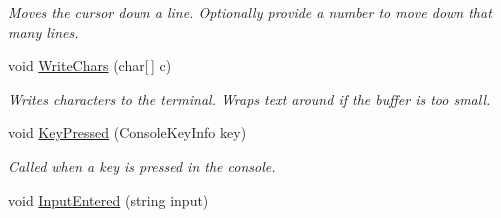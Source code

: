 \begin{DoxyCompactItemize}
\begin{DoxyCompactList}\small\item\em Moves the cursor down a line. Optionally provide a number to move down that many lines.\end{DoxyCompactList}\item 
\hypertarget{class_m_b_c_1_1_terminal_1_1_terminal_module_aee7bf9ed38e59a4b1c763fd439d3b69d}{void \hyperlink{class_m_b_c_1_1_terminal_1_1_terminal_module_aee7bf9ed38e59a4b1c763fd439d3b69d}{Write\-Chars} (char\mbox{[}$\,$\mbox{]} c)}\label{class_m_b_c_1_1_terminal_1_1_terminal_module_aee7bf9ed38e59a4b1c763fd439d3b69d}

\begin{DoxyCompactList}\small\item\em Writes characters to the terminal. Wraps text around if the buffer is too small.\end{DoxyCompactList}\item 
\hypertarget{class_m_b_c_1_1_terminal_1_1_terminal_module_ac0bc9a1f54471d08c4f8bae3c9bdcb1d}{void \hyperlink{class_m_b_c_1_1_terminal_1_1_terminal_module_ac0bc9a1f54471d08c4f8bae3c9bdcb1d}{Key\-Pressed} (Console\-Key\-Info key)}\label{class_m_b_c_1_1_terminal_1_1_terminal_module_ac0bc9a1f54471d08c4f8bae3c9bdcb1d}

\begin{DoxyCompactList}\small\item\em Called when a key is pressed in the console.\end{DoxyCompactList}\item 
\hypertarget{class_m_b_c_1_1_terminal_1_1_terminal_module_a86dab1e67db49bacc8be531682df444b}{void \hyperlink{class_m_b_c_1_1_terminal_1_1_terminal_module_a86dab1e67db49bacc8be531682df444b}{Input\-Entered} (string input)}\label{class_m_b_c_1_1_terminal_1_1_terminal_module_a86dab1e67db49bacc8be531682df444b}


\end{DoxyCompactItemize}
